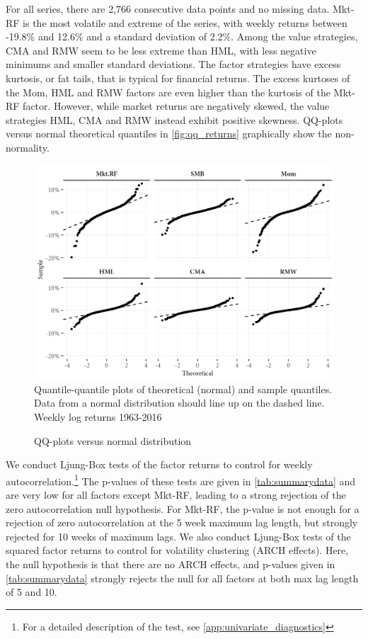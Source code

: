 For all series, there are 2,766 consecutive data points and no missing data. Mkt-RF is the most volatile and extreme of the series, with weekly returns between -19.8\% and 12.6\% and a standard deviation of 2.2\%. Among the value strategies, CMA and RMW seem to be less extreme than HML, with less negative minimums and smaller standard deviations. The factor strategies have excess kurtosis, or fat tails, that is typical for financial returns. The excess kurtoses of the Mom, HML and RMW factors are even higher than the kurtosis of the Mkt-RF factor. However, while market returns are negatively skewed, the value strategies HML, CMA and RMW instead exhibit positive skewness. QQ-plots versus normal theoretical quantiles in \autoref{fig:qq_returns} graphically show the non-normality.
\begin{figure}[htbp]
  \caption{QQ-plots versus normal distribution}
  \label{fig:qq_returns}
  \centering
  \begin{minipage}{\textwidth}
  \includegraphics[scale=1]{graphics/qq_returns.png}  
  \vspace{3mm}
  \footnotesize
  Quantile-quantile plots of theoretical (normal) and sample quantiles. Data from a normal distribution should line up on the dashed line. Weekly log returns 1963-2016
  \end{minipage}
\end{figure}

We conduct Ljung-Box tests of the factor returns to control for weekly autocorrelation.\footnote{For a detailed description of the test, see \autoref{app:univariate_diagnostics}} The p-values of these tests are given in \autoref{tab:summarydata} and are very low for all factors except Mkt-RF, leading to a strong rejection of the zero autocorrelation null hypothesis. For Mkt-RF, the p-value is not enough for a rejection of zero autocorrelation at the 5 week maximum lag length, but strongly rejected for 10 weeks of maximum lags. We also conduct Ljung-Box tests of the squared factor returns to control for volatility clustering (ARCH effects). Here, the null hypothesis is that there are no ARCH effects, and p-values given in \autoref{tab:summarydata} strongly rejects the null for all factors at both max lag length of 5 and 10.

